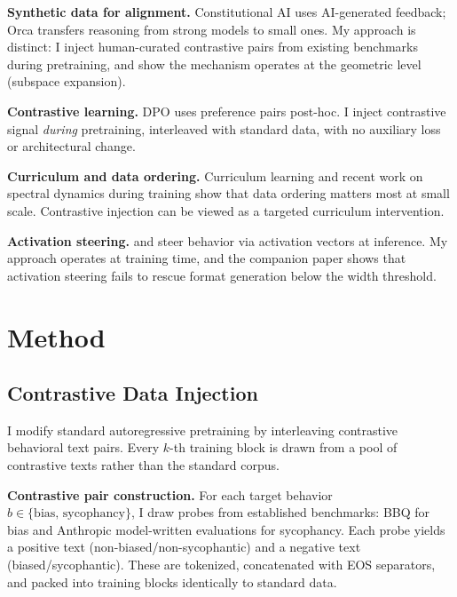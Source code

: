\documentclass[11pt]{article}
\begin{document}
\textbf{Synthetic data for alignment.} Constitutional AI \citep{bai2022constitutional} uses AI-generated feedback; Orca \citep{mukherjee2023orca} transfers reasoning from strong models to small ones. My approach is distinct: I inject human-curated contrastive pairs from existing benchmarks during pretraining, and show the mechanism operates at the geometric level (subspace expansion).

\textbf{Contrastive learning.} DPO \citep{rafailov2023direct} uses preference pairs post-hoc. I inject contrastive signal \emph{during} pretraining, interleaved with standard data, with no auxiliary loss or architectural change.

\textbf{Curriculum and data ordering.} Curriculum learning \citep{bengio2009curriculum} and recent work on spectral dynamics during training \citep{elgaar2026curriculum} show that data ordering matters most at small scale. Contrastive injection can be viewed as a targeted curriculum intervention.

\textbf{Activation steering.} \citet{turner2023steering} and \citet{rimsky2024steering} steer behavior via activation vectors at inference. My approach operates at training time, and the companion paper \citep{sanchez2026expression} shows that activation steering fails to rescue format generation below the width threshold.


\section{Method}

\subsection{Contrastive Data Injection}

I modify standard autoregressive pretraining by interleaving contrastive behavioral text pairs. Every $k$-th training block is drawn from a pool of contrastive texts rather than the standard corpus.

\textbf{Contrastive pair construction.} For each target behavior $b \in \{\text{bias, sycophancy}\}$, I draw probes from established benchmarks: BBQ \citep{parrish2022bbq} for bias and Anthropic model-written evaluations \citep{perez2023discovering} for sycophancy. Each probe yields a positive text (non-biased/non-sycophantic) and a negative text (biased/sycophantic). These are tokenized, concatenated with EOS separators, and packed into training blocks identically to standard data.
\end{document}
